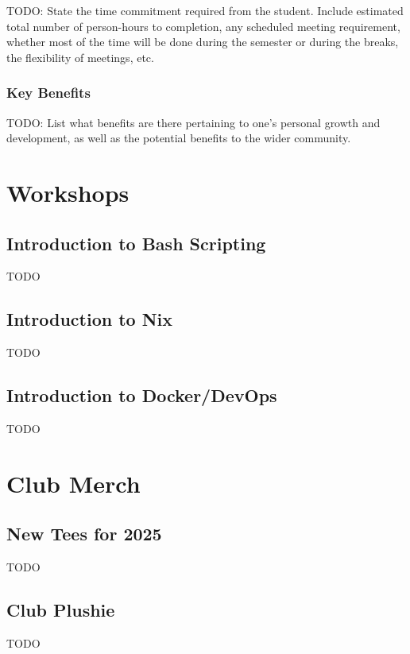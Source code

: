 \documentclass[11pt,fleqn]{article}
\begin{document}
TODO: State the time commitment required from the student.  Include estimated total number of person-hours to completion, any scheduled meeting requirement, whether most of the time will be done during the semester or during the breaks, the flexibility of meetings, etc.

\subsubsection*{Key Benefits}

TODO: List what benefits are there pertaining to one's personal growth and development, as well as the potential benefits to the wider community.

\newpage

\section{Workshops}

\subsection{Introduction to Bash Scripting}

TODO

\subsection{Introduction to Nix}

TODO

\subsection{Introduction to Docker/DevOps}

TODO

\newpage

\section{Club Merch}

\subsection{New Tees for 2025}

TODO

\subsection{Club Plushie}

TODO
\end{document}
